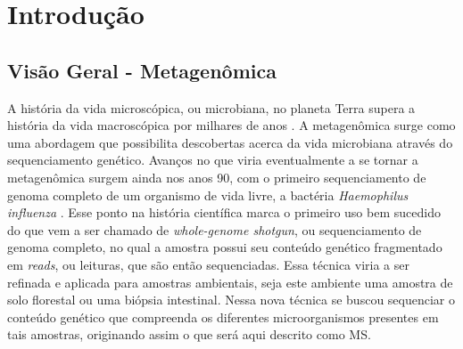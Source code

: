 \documentclass[
	12pt,				%
	oneside,			%
	a4paper,			%
	chapter=TITLE,		%
	section=TITLE,		%
	english,			%
	brazil				%
	]{abntex2}
\begin{document}
{%
	\hypersetup{hidelinks}
	\listoffigures*
	\cleardoublepage


	\listoftables*
	\cleardoublepage

	\imprimirlistadesiglas


	\tableofcontents*
	\cleardoublepage

}%


\textual

\chapter{Introdução}\label{intro}

\section{Visão Geral - Metagenômica}\label{visuxe3o-geral---metagenuxf4mica}

A história da vida microscópica, ou microbiana, no planeta Terra supera a história da vida macroscópica por milhares de anos \autocite{magnabosco2024}. A metagenômica surge como uma abordagem que possibilita descobertas acerca da vida microbiana através do sequenciamento genético. Avanços no que viria eventualmente a se tornar a metagenômica surgem ainda nos anos 90, com o primeiro sequenciamento de genoma completo de um organismo de vida livre, a bactéria \emph{Haemophilus influenza} \autocite{wooley2010}. Esse ponto na história científica marca o primeiro uso bem sucedido do que vem a ser chamado de \emph{whole-genome shotgun}, ou sequenciamento de genoma completo, no qual a amostra possui seu conteúdo genético fragmentado em \emph{reads}, ou leituras, que são então sequenciadas. Essa técnica viria a ser refinada e aplicada para amostras ambientais, seja este ambiente uma amostra de solo florestal ou uma biópsia intestinal. Nessa nova técnica se buscou sequenciar o conteúdo genético que compreenda os diferentes microorganismos presentes em tais amostras, originando assim o que será aqui descrito como \gls{MS}.
\end{document}
